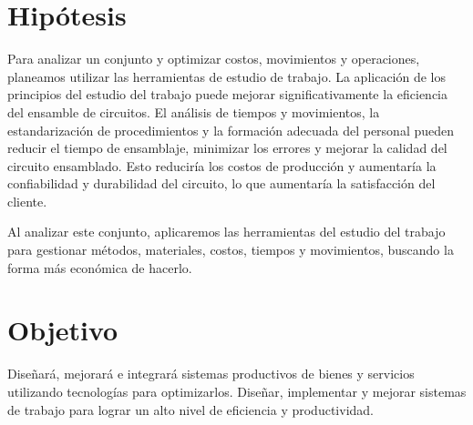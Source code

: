     \section{Hipótesis}
    Para analizar un conjunto y optimizar costos, movimientos y operaciones, planeamos utilizar las herramientas de estudio de trabajo. La aplicación de los principios del estudio del trabajo puede mejorar significativamente la eficiencia del ensamble de circuitos. El análisis de tiempos y movimientos, la estandarización de procedimientos y la formación adecuada del personal pueden reducir el tiempo de ensamblaje, minimizar los errores y mejorar la calidad del circuito ensamblado. Esto reduciría los costos de producción y aumentaría la confiabilidad y durabilidad del circuito, lo que aumentaría la satisfacción del cliente.
    
    Al analizar este conjunto, aplicaremos las herramientas del estudio del trabajo para gestionar métodos, materiales, costos, tiempos y movimientos, buscando la forma más económica de hacerlo.
    \section{Objetivo}
    
    Diseñará, mejorará e integrará sistemas productivos de bienes y servicios utilizando tecnologías para optimizarlos.
    Diseñar, implementar y mejorar sistemas de trabajo para lograr un alto nivel de eficiencia y productividad.
